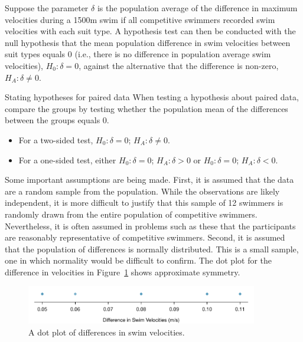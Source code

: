Suppose the parameter $\delta$ is the population average of the difference in maximum velocities during a 1500m swim if all competitive swimmers recorded swim velocities with each suit type. A hypothesis test can then be conducted with the null hypothesis that the mean population difference in swim velocities between suit types equals 0 (i.e., there is no difference in population average swim velocities), $H_0: \delta = 0$, against the alternative that the difference is non-zero, $H_A: \delta \neq 0$.

\begin{onebox}{Stating hypotheses for paired data}
When testing a hypothesis about paired data, compare the groups by testing whether the population mean of the differences between the groups equals 0.
\begin{itemize}
\item For a two-sided test, $H_0: \delta = 0$; $H_A: \delta \neq 0$.
\item For a one-sided test, either $H_0: \delta = 0$; $H_A: \delta > 0$ or  $H_0: \delta = 0$; $H_A: \delta < 0$.
\end{itemize}
\end{onebox}

Some important assumptions are being made. First, it is assumed that the data are a random sample from the population. While the observations are likely independent, it is more difficult to justify that this sample of 12 swimmers is randomly drawn from the entire population of competitive swimmers. Nevertheless, it is often assumed in problems such as these that the participants are reasonably representative of competitive swimmers. Second, it is assumed that the population of differences is normally distributed. This is a small sample, one in which normality would be difficult to confirm. The dot plot for the difference in velocities in Figure~\ref{swimDotPlot} shows approximate symmetry.

\begin{figure}[h]
	\centering
	\includegraphics[width=0.9\textwidth]{ch_06a_inference_for_means_oi_biostat/figures/swimDotPlot/swimDotPlot}
	\caption{A dot plot of differences in swim velocities.}
	\label{swimDotPlot}
\end{figure}

